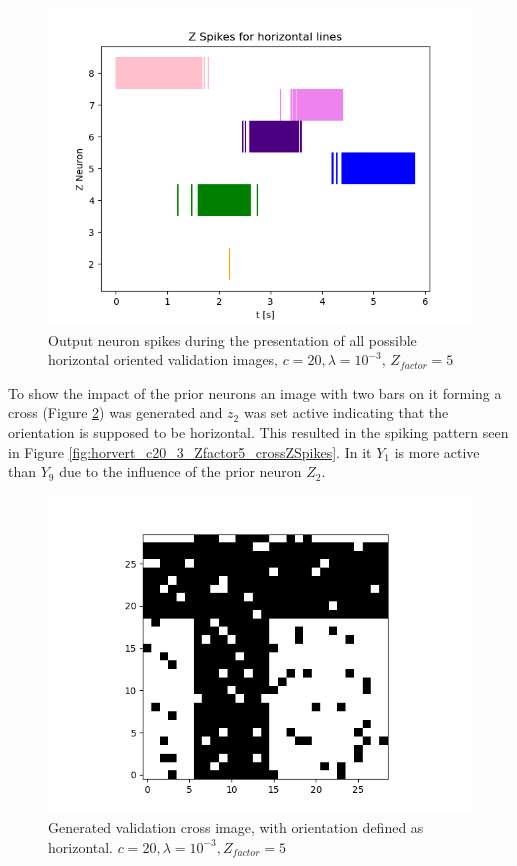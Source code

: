 \begin{figure}
  \includegraphics[width=\linewidth]{figures/horvert/horvert_c20_3_Zfactor5_horizontalZSpikes.png}
  \caption{Output neuron spikes during the presentation of all possible horizontal oriented validation images, $c = 20, \lambda = 10^{-3}$, $Z_{factor} = 5$}
  \label{fig:horvert_c20_3_Zfactor5_horizontalZSpikes}
\end{figure}


To show the impact of the prior neurons an image with two bars on it forming a cross (Figure \ref{fig:horvertValidationCross}) was generated and $z_2$ was set active indicating that the orientation is supposed to be horizontal. This resulted in the spiking pattern seen in Figure \ref{fig:horvert_c20_3_Zfactor5_crossZSpikes}. In it $Y_1$ is more active than $Y_9$ due to the influence of the prior neuron $Z_2$.

\begin{figure}
  \includegraphics[width=\linewidth]{figures/horvert/horvert_c20_3_Zfactor5_validationCross.png}
  \caption{Generated validation cross image, with orientation defined as horizontal. $c = 20, \lambda = 10^{-3}, Z_{factor} = 5$}
  \label{fig:horvertValidationCross}
\end{figure}

